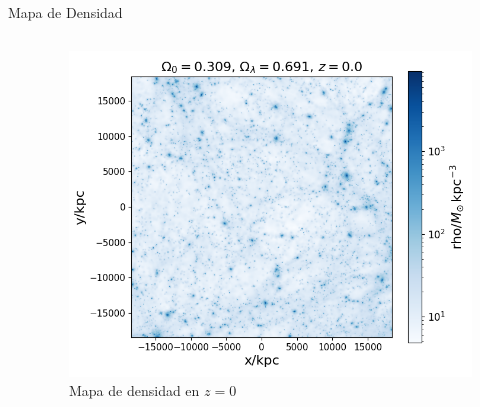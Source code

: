 \documentclass{beamer}
\begin{document}
\begin{frame}{Mapa de Densidad}
\begin{columns}[t]
\begin{column}{0.33\textwidth}
		\end{column}	

		\begin{column}{0.33\textwidth}
			
			\begin{figure}
				\includegraphics[scale=0.2]{RunCanonica/RunCanonicaZ0.png}
				\caption{\footnotesize Mapa de densidad en $z=0$}
			\end{figure}

		\end{column}		
		
	\end{columns}
\end{frame}




\end{document}
